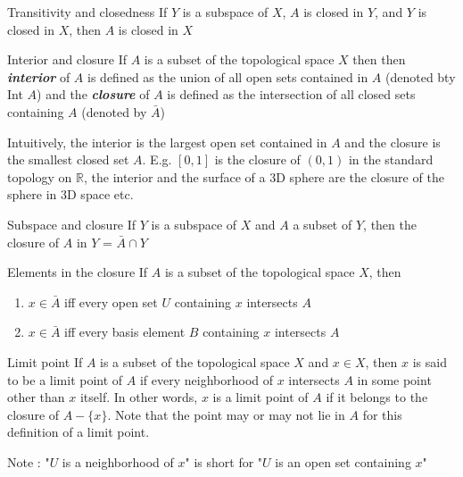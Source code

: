 \documentclass[titlepage, 12pt]{book}
\begin{document}
\begin{theorem}{Transitivity and closedness}{}
    If $Y$ is a subspace of $X$, $A$ is closed in $Y$, and $Y$ is closed in $X$,
    then $A$ is closed in $X$
\end{theorem}

\begin{definition}{Interior and closure}{}
    If $A$ is a subset of the topological space $X$ then then
    \textbf{\textit{interior}} of $A$ is defined as the union of all open sets
    contained in $A$ (denoted bty Int $A$) and the \textbf{\textit{closure}} of
    $A$ is defined as the intersection of all closed sets containing $A$
    (denoted by $\bar{A}$)
\end{definition}

Intuitively, the interior is the largest open set contained in $A$ and the
closure is the smallest closed set $A$. E.g.  $[0, 1]$ is the closure of $(0,
1)$ in the standard topology on $\mathbb{R}$, the interior and the surface of a
3D sphere are the closure of the sphere in 3D space etc.

\begin{theorem}{Subspace and closure}{}
    If $Y$ is a subspace of $X$ and $A$ a subset of $Y$, then the closure of $A$
    in $Y$ = $\bar{A}\cap Y$
\end{theorem}

\begin{theorem}{Elements in the closure}{}
    If $A$ is a subset of the topological space $X$, then
    \begin{enumerate}
        \item $x\in\bar{A}$ iff every open set $U$ containing $x$ intersects $A$
        \item $x\in\bar{A}$ iff every basis element $B$ containing $x$
            intersects $A$
    \end{enumerate}
\end{theorem}

\begin{definition}{Limit point}{}
    If $A$ is a subset of the topological space $X$ and $x\in X$, then $x$ is
    said to be a limit point of $A$ if every neighborhood of $x$ intersects $A$
    in some point other than $x$ itself. In other words, $x$ is a limit point of
    $A$ if it belongs to the closure of $A - \{x\}$. Note that the point may or
    may not lie in $A$ for this definition of a limit point.
\end{definition}

Note : "$U$ is a neighborhood of $x$" is short for "$U$ is an open set
containing $x$"
\end{document}
